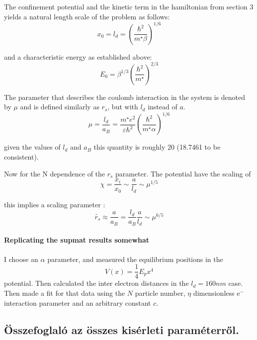 \documentclass[12pt,a4paper]{article}
\numberwithin{equation}{section}
\begin{document}
The confinement potential and the kinetic term in the hamiltonian from section 3 yields a natural length scale of the problem as follows:
\begin{equation}
x_0 = l_d = \left( \frac{\hbar^2}{m^\star \beta}  \right)^{1/6}
\end{equation} 

and a characteristic energy as established above:
\begin{equation}
E_0 = \beta^{1/3} \left( \frac{\hbar^2}{m^\star}  \right)^{2/3}
\end{equation}

The parameter that describes the coulomb interaction in the system is denoted by $\mu$ and  is defined similarly as $r_s$, but with $l_d$ instead of $a$.
\begin{equation}
\mu = \frac{l_d}{a_B} = \frac{m^\star e^2}{\varepsilon \hbar^2} \left( \frac{\hbar^2}{m^\star \alpha}  \right)^{1/6}
\end{equation}

given the values of $l_d$ and $a_B$ this quantity is roughly 20 (18.7461 to be consistent). 



Now for the N dependence of the $r_s$ parameter. The potential have the scaling of
\begin{equation}
\chi = \frac{x_i}{x_0} \sim \frac{a}{l_d} \sim \mu^{1/5}
\end{equation}

this implies a scaling parameter :
\begin{equation}
\tilde{r_s} \approx \frac{a}{a_B} = \frac{l_d}{a_B}\frac{a}{l_d} \sim \mu^{6/5}
\end{equation}

\paragraph{Replicating the supmat results somewhat}
I choose an $\alpha$ parameter, and measured the equilibrium positions in the 
\begin{equation}
V(x) = \frac{1}{4}E_p x^4
\end{equation}
potential. Then calculated the inter electron distances in the $l_d = 160 nm$ case. Then made a fit for that data using the $N$ particle number, $\eta$ dimensionless e$^-$ interaction parameter and an arbitrary constant $c$.

{\color{red}{Ábrát érkezik ide; találtak az eredmények}}


\subsection{Összefoglaló az összes kisérleti paraméterről.}
\newpage
\end{document}
